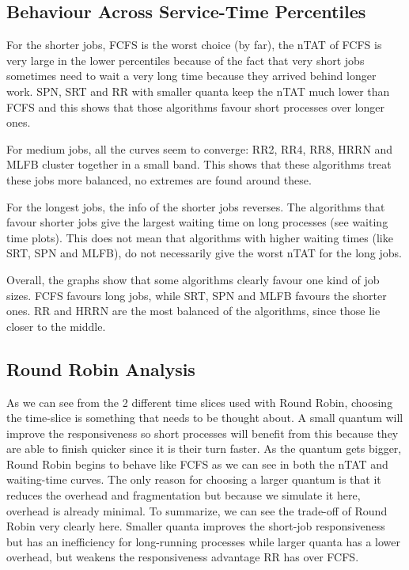 \documentclass[a4paper,11pt]{article}
\begin{document}
\subsection{Behaviour Across Service-Time Percentiles}
For the shorter jobs, FCFS is the worst choice (by far), the nTAT of FCFS is very large in the lower percentiles because of the fact that very short jobs sometimes need to wait a very long time because they arrived behind longer work.
SPN, SRT and RR with smaller quanta keep the nTAT much lower than FCFS and this shows that those algorithms favour short processes over longer ones.

For medium jobs, all the curves seem to converge: RR2, RR4, RR8, HRRN and MLFB cluster together in a small band.
This shows that these algorithms treat these jobs more balanced, no extremes are found around these.

For the longest jobs, the info of the shorter jobs reverses.
The algorithms that favour shorter jobs give the largest waiting time on long processes (see waiting time plots).
This does not mean that algorithms with higher waiting times (like SRT, SPN and MLFB), do not necessarily give the worst nTAT for the long jobs.

Overall, the graphs show that some algorithms clearly favour one kind of job sizes.
FCFS favours long jobs, while SRT, SPN and MLFB favours the shorter ones.
RR and HRRN are the most balanced of the algorithms, since those lie closer to the middle.

\subsection{Round Robin Analysis}
As we can see from the 2 different time slices used with Round Robin, choosing the time-slice is something that needs to be thought about.
A small quantum will improve the responsiveness so short processes will benefit from this because they are able to finish quicker since it is their turn faster.
As the quantum gets bigger, Round Robin begins to behave like FCFS as we can see in both the nTAT and waiting-time curves.
The only reason for choosing a larger quantum is that it reduces the overhead and fragmentation but because we simulate it here, overhead is already minimal.
To summarize, we can see the trade-off of Round Robin very clearly here.
Smaller quanta improves the short-job responsiveness but has an inefficiency for long-running processes while larger quanta has a lower overhead, but weakens the responsiveness advantage RR has over FCFS.
\end{document}
